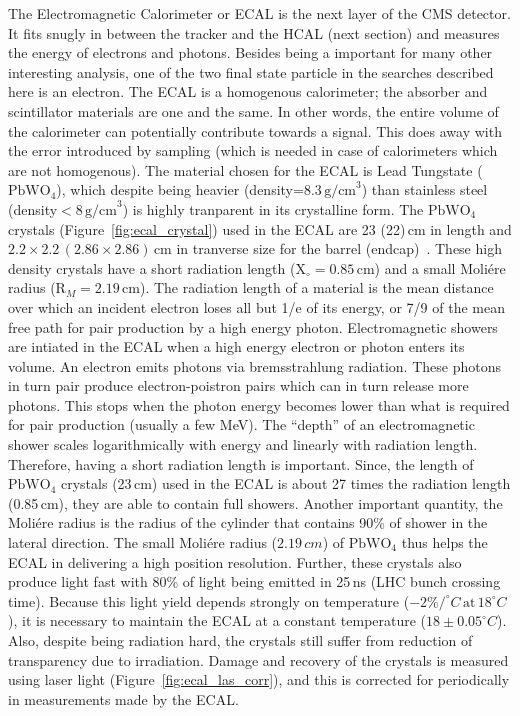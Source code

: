 The Electromagnetic Calorimeter or ECAL is the next layer of the CMS detector. It fits snugly in between the tracker and the HCAL (next section) and measures the energy of electrons and photons. Besides being a important for many other interesting analysis, one of the two final state particle in the searches described here is an electron. The ECAL is a homogenous calorimeter; the absorber and scintillator materials are one and the same. In other words, the entire volume of the calorimeter can potentially contribute towards a signal. This does away with the error introduced by sampling (which is needed in case of calorimeters which are not homogenous). The material chosen for the ECAL is Lead Tungstate ($\mathrm{PbWO}_4$), which despite being heavier (density=$8.3\,\mathrm{g/cm}^3$) than stainless steel (density$<8\,\mathrm{g/cm}^3$) is highly tranparent in its crystalline form. The $\mathrm{PbWO}_4$ crystals (Figure~\ref{fig:ecal_crystal}) used in the ECAL are 23 (22)\,cm in length and $2.2\times2.2\,(2.86\times2.86)$\,cm in tranverse size for the barrel (endcap)~\cite{ecal2}. These high density crystals have a short radiation length ($\mathrm{X}_{\circ}=0.85$\,cm) and a small Moli\'ere radius ($\mathrm{R}_{M}=2.19$\,cm). The radiation length of a material is the mean distance over which an incident electron loses all but 1/e of its energy, or 7/9 of the mean free path for pair production by a high energy photon. Electromagnetic showers are intiated in the ECAL when a high energy electron or photon enters its volume. An electron emits photons via bremsstrahlung radiation. These photons in turn pair produce electron-poistron pairs which can in turn release more photons. This stops when the photon energy becomes lower than what is required for pair production (usually a few MeV). The ``depth'' of an electromagnetic shower scales logarithmically with energy and linearly with radiation length. Therefore, having a short radiation length is important. Since, the length of $\mathrm{PbWO}_4$ crystals (23\,cm) used in the ECAL is about 27 times the radiation length (0.85\,cm), they are able to contain full showers. Another important quantity, the Moli\'ere radius is the radius of the cylinder that contains 90\% of shower in the lateral direction. The small Moli\'ere radius ($2.19\,cm$) of $\mathrm{PbWO}_4$ thus helps the ECAL in delivering a high position resolution. Further, these crystals also produce light fast with 80\% of light being emitted in 25\,ns (LHC bunch crossing time). Because this light yield depends strongly on temperature ($-2\%/^{\circ}C\,\mathrm{at}\,18^{\circ}C$), it is necessary to maintain the ECAL at a constant temperature ($18\pm0.05^{\circ}C$). Also, despite being radiation hard, the crystals still suffer from reduction of transparency due to irradiation. Damage and recovery of the crystals is measured using laser light (Figure~\ref{fig:ecal_las_corr}), and this is corrected for periodically in measurements made by the ECAL.     
